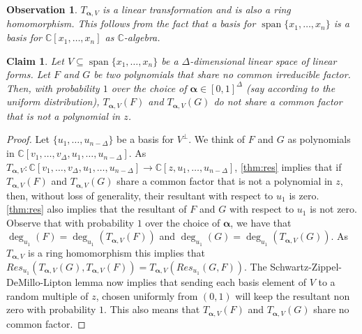 \documentclass[10pt,a4paper]{article}
\newtheorem{claim}[theorem]{Claim}
\newtheorem{observation}[theorem]{Observation}
\newcommand{\vecalpha}{\boldsymbol{\alpha}}
\newcommand{\vaa}{{\vecalpha}}
\renewcommand{\C}{\mathbb{C}}
\newcommand{\MVar}[2]{{#1}_1,\ldots, {#1}_{#2}}
\newcommand{\PRing}[3]{\mathbb{#1}[ \MVar{#2}{#3}]}
\newcommand{\CRing}[2]{\PRing{C}{#1}{#2}}
\newcommand{\spn}[1]{\operatorname{span}\{{#1}\}}
\begin{document}
\begin{observation}
$T_{\vaa, V}$ is a linear transformation and is also a ring homomorphism. This follows from the fact that a basis for $\spn{\MVar{x}{n}}$ is a basis for $\CRing{x}{n}$ as $\C$-algebra. 
\end{observation}





































\begin{claim}\label{cla:res-z-ampping}
	Let $V\subseteq \spn{x_1,\ldots,x_n}$ be a $\Delta$-dimensional linear space of linear forms. Let $F$ and  $G$ be two polynomials that share no common irreducible factor. Then, with probability $1$ over the choice of $\vaa \in [0,1]^{\Delta}$ (say according to the uniform distribution), $T_{\vaa, V}(F)$ and $T_{\vaa, V}(G)$ do not share a common factor that is not a polynomial in $z$.
\end{claim}

\begin{proof}
	Let $\lbrace\MVar{u}{{n-\Delta}}\rbrace$ be a basis for $V^\perp$. We think of $F$ and $G$ as polynomials in $\C[\MVar{v}{\Delta}, \MVar{u}{n-\Delta}]$.
	As $T_{\vaa,V}: \C[\MVar{v}{\Delta}, \MVar{u}{n-\Delta}] \rightarrow \C[z, \MVar{u}{n-\Delta}]$,  
	\autoref{thm:res} implies that if $T_{\vaa, V}(F)$ and  $T_{\vaa, V}(G)$ share a common factor that is not a polynomial in $z$, then, without loss of generality, their resultant with respect to $u_1$ is zero. \autoref{thm:res} also implies that the resultant of $F$ and $G$ with respect to $u_1$ is not zero. Observe that with probability $1$ over the choice of $\vaa$, we have that $\deg_{u_1}(F) = \deg_{u_1}(T_{\vaa, V}(F))$ and $\deg_{u_1}(G) = \deg_{u_1}(T_{\vaa, V}(G))$.
	As $T_{\vaa, V}$ is a ring homomorphism this implies that $Res_{u_1}(T_{\vaa, V}(G), T_{\vaa, V}(F)) = T_{\vaa, V}(Res_{u_1}(G, F))$.  The Schwartz-Zippel-DeMillo-Lipton lemma now implies that sending each basis element of $V$ to a random multiple of $z$, chosen uniformly from $(0,1)$ will keep the resultant non zero with probability $1$. This also means that $T_{\vaa, V}(F)$ and $T_{\vaa, V}(G)$ share no common factor.
\end{proof}
\end{document}
